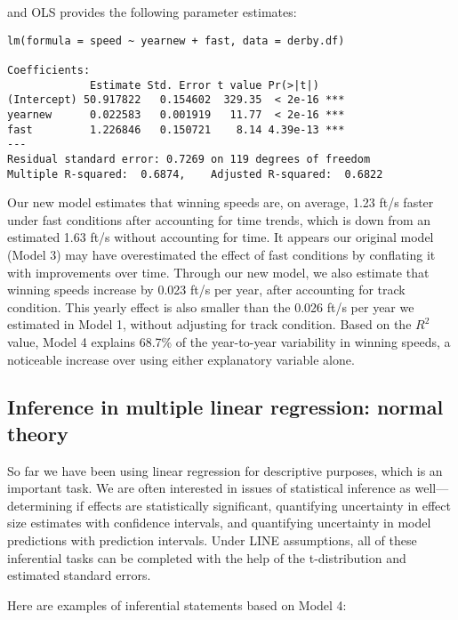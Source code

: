 \documentclass[
]{krantz}
\begin{document}
and OLS provides the following parameter estimates:

\begin{verbatim}
lm(formula = speed ~ yearnew + fast, data = derby.df)

Coefficients:
             Estimate Std. Error t value Pr(>|t|)    
(Intercept) 50.917822   0.154602  329.35  < 2e-16 ***
yearnew      0.022583   0.001919   11.77  < 2e-16 ***
fast         1.226846   0.150721    8.14 4.39e-13 ***
---
Residual standard error: 0.7269 on 119 degrees of freedom
Multiple R-squared:  0.6874,    Adjusted R-squared:  0.6822 
\end{verbatim}

Our new model estimates that winning speeds are, on average, 1.23 ft/s faster under fast conditions after accounting for time trends, which is down from an estimated 1.63 ft/s without accounting for time. It appears our original model (Model 3) may have overestimated the effect of fast conditions by conflating it with improvements over time. Through our new model, we also estimate that winning speeds increase by 0.023 ft/s per year, after accounting for track condition. This yearly effect is also smaller than the 0.026 ft/s per year we estimated in Model 1, without adjusting for track condition. Based on the \(R^2\) value, Model 4 explains 68.7\% of the year-to-year variability in winning speeds, a noticeable increase over using either explanatory variable alone.

\hypertarget{multreg-inference}{%
\subsection{Inference in multiple linear regression: normal theory}\label{multreg-inference}}

So far we have been using linear regression for descriptive purposes, which is an important task. We are often interested in issues of statistical inference as well---determining if effects are statistically significant, quantifying uncertainty in effect size estimates with confidence intervals, and quantifying uncertainty in model predictions with prediction intervals. Under LINE assumptions, all of these inferential tasks can be completed with the help of the t-distribution and estimated standard errors.

Here are examples of inferential statements based on Model 4:
\end{document}
